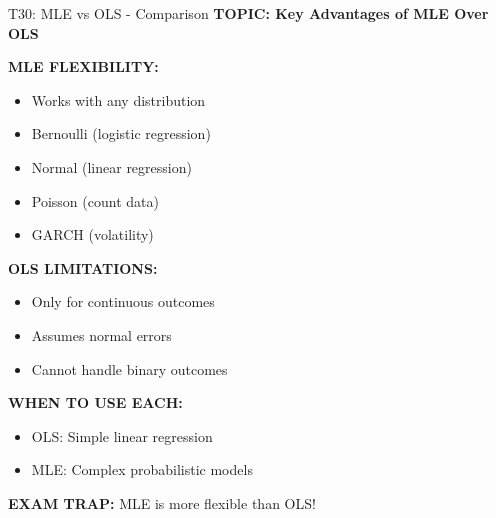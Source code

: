 \documentclass[8pt]{beamer}
\begin{document}
	\begin{frame}{T30: MLE vs OLS - Comparison}
		\fontsize{6.5}{7.5}\selectfont
		\textbf{TOPIC: Key Advantages of MLE Over OLS}
		
		\vspace{0.1cm}
		\textbf{MLE FLEXIBILITY:}
		\begin{itemize}
			\item Works with any distribution
			\item Bernoulli (logistic regression)
			\item Normal (linear regression)
			\item Poisson (count data)
			\item GARCH (volatility)
		\end{itemize}
		
		\vspace{0.1cm}
		\textbf{OLS LIMITATIONS:}
		\begin{itemize}
			\item Only for continuous outcomes
			\item Assumes normal errors
			\item Cannot handle binary outcomes
		\end{itemize}
		
		\vspace{0.1cm}
		\textbf{WHEN TO USE EACH:}
		\begin{itemize}
			\item \textcolor{myblue}{OLS:} Simple linear regression
			\item \textcolor{myblue}{MLE:} Complex probabilistic models
		\end{itemize}
		
		\textcolor{myred}{\textbf{EXAM TRAP:}} MLE is \textcolor{myblue}{more flexible} than OLS!
	\end{frame}
	
\end{document}
